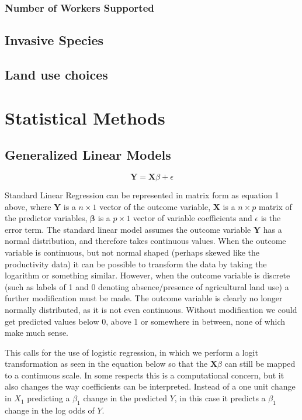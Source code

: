 \documentclass{article}
\newcommand{\bX}{\mathbf{X}}
\newcommand{\bY}{\mathbf{Y}}
\newcommand{\bbeta}{\mathbf{\beta}}
\begin{document}
\subsubsection{Number of Workers Supported}


\subsection{Invasive Species}

\subsection{Land use choices}


\section{Statistical Methods} \label{stat_methods}

\subsection{Generalized Linear Models}

\[\bY = \bX\beta + \epsilon \tag{1}\]

Standard Linear Regression can be represented in matrix form as equation 1 above, where $\bY$ is a $n \times 1$ vector of 
the outcome variable, $\bX$ is a $n \times p$ matrix of the predictor variables, $\bbeta$ is a $p \times 1$ vector of variable coefficients and $\epsilon$ is the error 
term. The standard linear model assumes the outcome variable $\bY$ has a normal distribution, and therefore takes 
continuous values. When the outcome variable is continuous, but not normal shaped (perhaps skewed like the productivity 
data) it can be possible to transform the data by taking the logarithm or something similar. However, when the outcome 
variable is discrete (such as labels of 1 and 0 denoting absence/presence of agricultural land use) a further modification must be made. The outcome variable is clearly no longer normally distributed, as it is not even continuous. Without modification we could get predicted values below 0, above 1 or somewhere in between, none of which make much sense.

This calls for the use of logistic regression, in which we perform a logit transformation as seen in the equation below so that the 
$\bX\beta$ can still be mapped to a continuous scale. In some respects this is a computational concern, but it also changes the 
way coefficients can be interpreted. Instead of a one unit change in $X_1$ predicting a $\beta_1$ change in the predicted $Y$, 
in this case it predicts a $\beta_1$ change in the log odds of $Y$.
\end{document}
